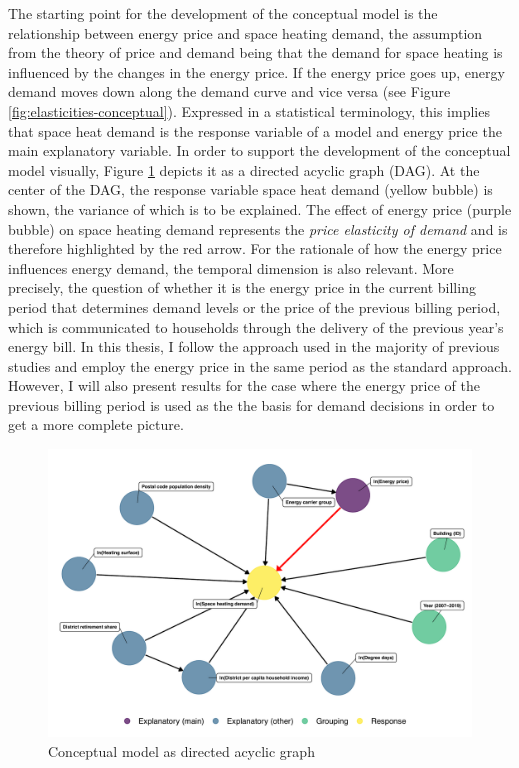 \documentclass[12pt,twoside]{reedthesis}
\begin{document}
The starting point for the development of the conceptual model is the relationship between energy price and space heating demand, the assumption from the theory of price and demand being that the demand for space heating is influenced by the changes in the energy price. If the energy price goes up, energy demand moves down along the demand curve and vice versa (see Figure \ref{fig:elasticities-conceptual}). Expressed in a statistical terminology, this implies that space heat demand is the response variable of a model and energy price the main explanatory variable. In order to support the development of the conceptual model visually, Figure \ref{fig:dag} depicts it as a directed acyclic graph (DAG). At the center of the DAG, the response variable space heat demand (yellow bubble) is shown, the variance of which is to be explained. The effect of energy price (purple bubble) on space heating demand represents the \emph{price elasticity of demand} and is therefore highlighted by the red arrow. For the rationale of how the energy price influences energy demand, the temporal dimension is also relevant. More precisely, the question of whether it is the energy price in the current billing period that determines demand levels or the price of the previous billing period, which is communicated to households through the delivery of the previous year's energy bill. In this thesis, I follow the approach used in the majority of previous studies and employ the energy price in the same period as the standard approach. However, I will also present results for the case where the energy price of the previous billing period is used as the the basis for demand decisions in order to get a more complete picture.
\begin{figure}

{\centering \includegraphics[width=1\linewidth]{figure/dag_red} 

}

\caption[Conceptual model as directed acyclic graph]{Conceptual model as directed acyclic graph}\label{fig:dag}
\end{figure}
\end{document}
